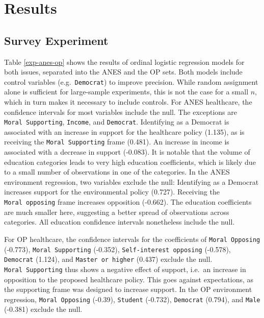 \documentclass[12pt,econ]{sources/authesis}
\begin{document}
\hypertarget{framing-results}{%
\section{Results}\label{framing-results}}

\hypertarget{framing-results-experiment}{%
\subsection{Survey Experiment}\label{framing-results-experiment}}

Table \ref{exp-anes-op} shows the results of ordinal logistic regression models for both issues, separated into the ANES and the OP sets. Both models include control variables (e.g.~\texttt{Democrat}) to improve precision. While random assignment alone is sufficient for large-sample experiments, this is not the case for a small \(n\), which in turn makes it necessary to include controls. For ANES healthcare, the confidence intervals for most variables include the null. The exceptions are \texttt{Moral\ Supporting}, \texttt{Income}, and \texttt{Democrat}. Identifying as a Democrat is associated with an increase in support for the healthcare policy (1.135), as is receiving the \texttt{Moral\ Supporting} frame (0.481). An increase in income is associated with a decrease in support (-0.083). It is notable that the volume of education categories leads to very high education coefficients, which is likely due to a small number of observations in one of the categories. In the ANES environment regression, two variables exclude the null: Identifying as a Democrat increases support for the environmental policy (0.727). Receiving the \texttt{Moral\ opposing} frame increases opposition (-0.662). The education coefficients are much smaller here, suggesting a better spread of observations across categories. All education confidence intervals nonetheless include the null.

For OP healthcare, the confidence intervals for the coefficients of \texttt{Moral\ Opposing} (-0.773), \texttt{Moral\ Supporting} (-0.352), \texttt{Self-interest\ opposing} (-0.578), \texttt{Democrat} (1.124), and \texttt{Master\ or\ higher} (0.437) exclude the null. \texttt{Moral\ Supporting} thus shows a negative effect of support, i.e.~an increase in opposition to the proposed healthcare policy. This goes against expectations, as the supporting frame was designed to increase support. In the OP environment regression, \texttt{Moral\ Opposing} (-0.39), \texttt{Student} (-0.732), \texttt{Democrat} (0.794), and \texttt{Male} (-0.381) exclude the null.
\end{document}
